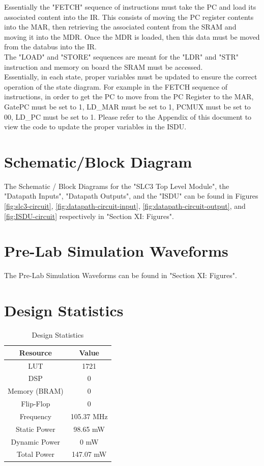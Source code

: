\documentclass[journal, twocolumn, final,11pt,letterpaper]{IEEEtran}
\begin{document}
Essentially the "FETCH" sequence of instructions must take the PC and load its associated content into the IR. This consists of moving the PC register contents into the MAR, then retrieving the associated content from the SRAM and moving it into the MDR. Once the MDR is loaded, then this data must be moved from the databus into the IR. \\

The "LOAD" and "STORE" sequences are meant for the "LDR" and "STR" instruction and memory on board the SRAM must be accessed. \\

Essentially, in each state, proper variables must be updated to ensure the correct operation of the state diagram. For example in the FETCH sequence of instructions, in order to get the PC to move from the PC Register to the MAR, GatePC must be set to 1, LD\_MAR must be set to 1, PCMUX must be set to 00, LD\_PC must be set to 1. Please refer to the Appendix of this document to view the code to update the proper variables in the ISDU. 

\section{Schematic/Block Diagram}
The Schematic / Block Diagrams for the "SLC3 Top Level Module", the "Datapath Inputs", "Datapath Outputs", and the "ISDU" can be found in Figures \ref{fig:slc3-circuit}, \ref{fig:datapath-circuit-input}, \ref{fig:datapath-circuit-output}, and \ref{fig:ISDU-circuit} respectively in "Section XI: Figures".

\section{Pre-Lab Simulation Waveforms}
The Pre-Lab Simulation Waveforms can be found in "Section XI: Figures".

\section{Design Statistics}
\begin{table}[htbp]
	\centering
	\begin{tabular}{c|c}	%
		\toprule	%
		Resource & Value \\
		\midrule
		LUT & 1721\\
		DSP & 0\\
		Memory (BRAM) & 0\\
		Flip-Flop & 0\\
		Frequency & 105.37 MHz\\
		Static Power & 98.65 mW\\
		Dynamic Power & 0 mW\\
		Total Power & 147.07 mW\\
		\bottomrule	%
	\end{tabular}%
	\caption{Design Statistics}
	\label{tab:table2}	%
\end{table}%
\end{document}
